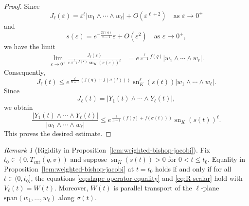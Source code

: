 \documentclass[psamsfonts]{amsart}
\theoremstyle{definition}
\theoremstyle{remark}
\newtheorem{rem}[thm]{Remark}
\numberwithin{equation}{section}
\begin{document}
\begin{proof}
Since
$$
J_\ell(\varepsilon)
=
\varepsilon^\ell |w_1\wedge\cdots\wedge w_\ell|
+
O(\varepsilon^{\ell+2}) \quad \text{as }\varepsilon \to 0^+
$$
and
$$
s(\varepsilon)
=
e^{-\frac{2f(q)}{n-1}}\varepsilon
+
O(\varepsilon^2) \quad \text{as } \varepsilon \to 0^+,
$$
we have the limit
\begin{align*}
\lim_{\varepsilon\to0^+}
\frac{J_\ell(\varepsilon)}
{e^{\frac{\ell}{n-1}f(\varepsilon)}
\operatorname{sn}_K(s(\varepsilon))^\ell}
&=
e^{\frac{\ell}{n-1}f(q)}
|w_1\wedge\cdots\wedge w_\ell|.
\end{align*}
Consequently,
$$
J_\ell(t)
\le
e^{\frac{\ell}{n-1}\left(f(q)+f(\sigma(t))\right)}
\operatorname{sn}_K^\ell(s(t))
|w_1\wedge\cdots\wedge w_\ell|.
$$
Since
$$
J_\ell(t)=|Y_1(t)\wedge\cdots\wedge Y_\ell(t)|,
$$
we obtain
$$
\frac{|Y_1(t)\wedge\cdots\wedge Y_\ell(t)|}
{|w_1\wedge\cdots\wedge w_\ell|}
\leq
e^{\frac{\ell}{n-1}\left(f(q)+f(\sigma(t))\right)}
\operatorname{sn}_K(s(t))^\ell .
$$
This proves the desired estimate.
\end{proof}
\begin{rem}[Rigidity in Proposition~\ref{lem:weighted-bishop-jacobi}]
Fix $t_0 \in (0,T_{\mathrm{cut}}(q,v))$ and suppose $\operatorname{sn}_K(s(t)) >0$ for $ 0 < t \leq t_0$.
Equality in  Proposition~\ref{lem:weighted-bishop-jacobi} at $t = t_0$ holds if and only if for all $t \in (0,t_0]$, the equations \eqref{eq:shape-operator-equality} and \eqref{eq:R-scalar} hold with $V_\ell (t) = W(t)$.
Moreover, $W(t)$ is parallel transport of the $\ell$-plane $\mathrm{span}(w_1,\ldots, w_\ell)$ along $\sigma(t)$.

\end{rem}
\end{document}
